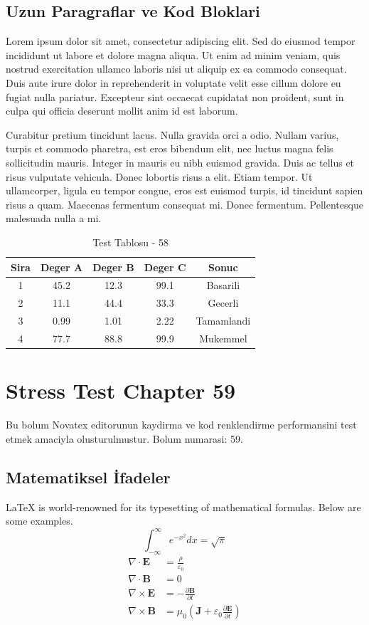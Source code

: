 \documentclass[12pt,a4paper]{article}
\begin{document}
\subsection{Uzun Paragraflar ve Kod Bloklari}
Lorem ipsum dolor sit amet, consectetur adipiscing elit. Sed do eiusmod tempor incididunt ut labore et dolore magna aliqua. Ut enim ad minim veniam, quis nostrud exercitation ullamco laboris nisi ut aliquip ex ea commodo consequat. Duis aute irure dolor in reprehenderit in voluptate velit esse cillum dolore eu fugiat nulla pariatur. Excepteur sint occaecat cupidatat non proident, sunt in culpa qui officia deserunt mollit anim id est laborum.

Curabitur pretium tincidunt lacus. Nulla gravida orci a odio. Nullam varius, turpis et commodo pharetra, est eros bibendum elit, nec luctus magna felis sollicitudin mauris. Integer in mauris eu nibh euismod gravida. Duis ac tellus et risus vulputate vehicula. Donec lobortis risus a elit. Etiam tempor. Ut ullamcorper, ligula eu tempor congue, eros est euismod turpis, id tincidunt sapien risus a quam. Maecenas fermentum consequat mi. Donec fermentum. Pellentesque malesuada nulla a mi.

\begin{table}[h!]
\centering
\begin{tabular}{|c|c|c|c|c|}
\hline
\textbf{Sira} & \textbf{Deger A} & \textbf{Deger B} & \textbf{Deger C} & \textbf{Sonuc} \\
\hline
1 & 45.2 & 12.3 & 99.1 & Basarili \\
2 & 11.1 & 44.4 & 33.3 & Gecerli \\
3 & 0.99 & 1.01 & 2.22 & Tamamlandi \\
4 & 77.7 & 88.8 & 99.9 & Mukemmel \\
\hline
\end{tabular}
\caption{Test Tablosu - 58}
\end{table}

\newpage
\section{Stress Test Chapter 59}
Bu bolum Novatex editorunun kaydirma ve kod renklendirme performansini test etmek amaciyla olusturulmustur. Bolum numarasi: 59.

\subsection{Matematiksel İfadeler}
\LaTeX{} is world-renowned for its typesetting of mathematical formulas. Below are some examples.
\begin{equation}
\int_{-\infty}^{\infty} e^{-x^2} dx = \sqrt{\pi}
\end{equation}
\begin{align}
\nabla \cdot \mathbf{E} &= \frac{\rho}{\varepsilon_0} \\
\nabla \cdot \mathbf{B} &= 0 \\
\nabla \times \mathbf{E} &= -\frac{\partial \mathbf{B}}{\partial t} \\
\nabla \times \mathbf{B} &= \mu_0\left(\mathbf{J} + \varepsilon_0 \frac{\partial \mathbf{E}}{\partial t}\right)
\end{align}
\end{document}
